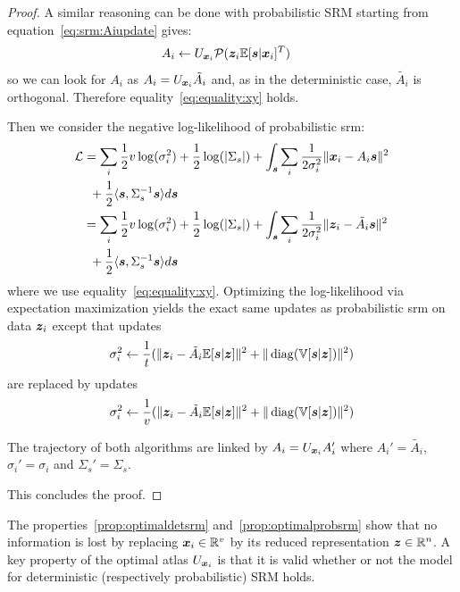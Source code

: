 \begin{proof}
  A similar reasoning can be done with probabilistic SRM starting from
  equation~\eqref{eq:srm:Aiupdate} gives:
  \begin{align}
    A_i &\leftarrow U_{\boldsymbol{x}_i}\mathcal{P}(\boldsymbol{z}_i \mathbb{E}[\boldsymbol{s}| \boldsymbol{x}_i]^T)
  \end{align}
  so we can look for $A_i$ as $A_i = U_{\boldsymbol{x}_i} \tilde{A_i}$ and, as in the
  deterministic case, $\tilde{A_i}$ is orthogonal.
  Therefore equality~\eqref{eq:equality:xy} holds.
  
  Then we consider the negative log-likelihood of probabilistic srm:
  \begin{align}
    \mathcal{L} &= \sum_i \frac12 v\log(\sigma_i^2) + \frac12 \log(|\Sigma_s|) + \int_{\boldsymbol{s}} \sum_i \frac1{2 \sigma_i^{2}}\|\boldsymbol{x}_i - A_i \boldsymbol{s} \|^2 \\& \enspace + \frac12 \langle \boldsymbol{s} , \Sigma_s^{-1} \boldsymbol{s} \rangle  d\boldsymbol{s} \\
          &= \sum_i \frac12 v \log(\sigma_i^2) + \frac12 \log(|\Sigma_s|) + \int_{\boldsymbol{s}} \sum_i \frac1{2 \sigma_i^{2}}\|\boldsymbol{z}_i - \tilde{A_i} \boldsymbol{s} \|^2 \\& \enspace+ \frac12 \langle \boldsymbol{s} , \Sigma_s^{-1} \boldsymbol{s} \rangle  d\boldsymbol{s}
  \end{align}
  where we use equality~\eqref{eq:equality:xy}.
  Optimizing the log-likelihood via expectation maximization yields the exact
  same updates as probabilistic srm on data $\boldsymbol{z}_i$
  except that updates
  \begin{align}
    \sigma_i^2 \leftarrow \frac1{t} (\| \boldsymbol{z}_i - \tilde{A_i} \mathbb{E}[\boldsymbol{s}|\boldsymbol{z}]\|^2 + \| \operatorname*{diag}(\mathbb{V}[\boldsymbol{s} | \boldsymbol{z}]) \|^2)
  \end{align}
  are replaced by updates
  \begin{align}
    \sigma_i^2 \leftarrow \frac1{v} (\| \boldsymbol{z}_i - \tilde{A_i} \mathbb{E}[\boldsymbol{s}|\boldsymbol{z}]\|^2 + \| \operatorname*{diag}(\mathbb{V}[\boldsymbol{s} | \boldsymbol{z}]) \|^2)
  \end{align}

  The trajectory of both algorithms are linked by $A_i = U_{\boldsymbol{x}_i}A_i'$ where
  $A_i' = \tilde{A_i}$, $\sigma_i' =
  \sigma_i$ and $\Sigma_s'  = \Sigma_s$.

  This concludes the proof.
\end{proof}

The properties~\ref{prop:optimaldetsrm} and~\ref{prop:optimalprobsrm} show that
no information is lost by replacing $\boldsymbol{x}_i \in \mathbb{R}^v$ by its reduced representation $\boldsymbol{z} \in \mathbb{R}^n$.
A key property of the optimal atlas $U_{\boldsymbol{x}_i}$ is that it is valid whether or
not the model for deterministic (respectively probabilistic) SRM holds.

